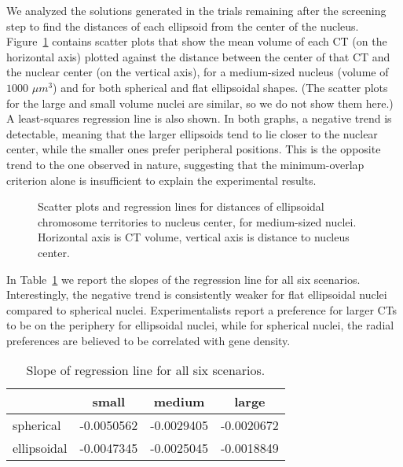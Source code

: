 \documentclass{siamltex}
\begin{document}
We analyzed the solutions generated in the trials remaining after the
screening step to find the distances of each ellipsoid from the center
of the nucleus. Figure~\ref{boxplot_medium_ellipsoids} contains scatter plots that
show the mean volume of each CT (on the horizontal axis) plotted
against the distance between the center of that CT and the nuclear
center (on the vertical axis), for a medium-sized nucleus (volume of
$1000$ $\mu m^3$) and for both spherical and flat ellipsoidal shapes.
(The scatter plots for the large and small volume nuclei are similar,
so we do not show them here.)  A least-squares regression line is also
shown. In both graphs, a negative trend is detectable, meaning that
the larger ellipsoids tend to lie closer to the nuclear center, while
the smaller ones prefer peripheral positions. This is the opposite
trend to the one observed in nature, suggesting that the
minimum-overlap criterion alone is insufficient to explain the
experimental results.

\begin{figure}[!t]
\centering
{} \;
\caption{Scatter plots and regression lines for distances of
  ellipsoidal chromosome territories to nucleus center, for
  medium-sized nuclei. Horizontal axis is CT volume, vertical axis is
  distance to nucleus center.}
\label{boxplot_medium_ellipsoids}
\end{figure}

In Table~\ref{table_slope_0.00} we report the slopes of the regression
line for all six scenarios. Interestingly, the negative trend is
consistently weaker for flat ellipsoidal nuclei compared to spherical
nuclei. Experimentalists report a preference for larger CTs to be on
the periphery for ellipsoidal nuclei, while for spherical nuclei, the
radial preferences are believed to be correlated with gene density.

\begin{table}[!h]
\centering
\caption{Slope of regression line for all six scenarios.}
\label{table_slope_0.00}
\begin{tabular}{l | c c c}
 & small & medium & large \\ \hline
 spherical & -0.0050562 & -0.0029405 & -0.0020672\\
 ellipsoidal & -0.0047345 & -0.0025045 & -0.0018849 \end{tabular}
 \end{table}
\end{document}
